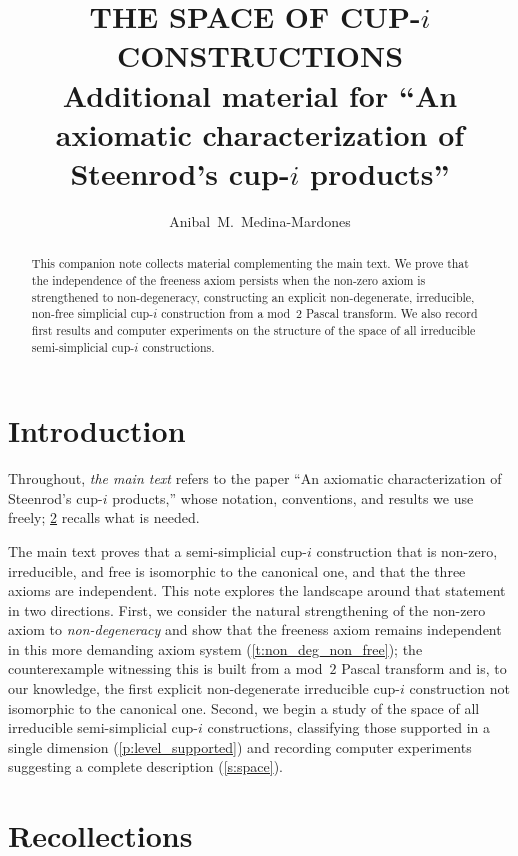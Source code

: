 \documentclass{amsart}
\title[Additional material]{THE SPACE OF CUP-$i$ CONSTRUCTIONS \\ \large Additional material for ``An axiomatic characterization of Steenrod's cup-$i$ products''}
\author{Anibal~M.~Medina-Mardones}
\begin{document}
\begin{abstract}
	This companion note collects material complementing the main text.
	We prove that the independence of the freeness axiom persists when the non-zero axiom is strengthened to non-degeneracy, constructing an explicit non-degenerate, irreducible, non-free simplicial \mbox{cup-$i$} construction from a mod~$2$ Pascal transform.
	We also record first results and computer experiments on the structure of the space of all irreducible semi-simplicial \mbox{cup-$i$} constructions.
\end{abstract}
\maketitle

\section{Introduction}\label{s:intro}

Throughout, \emph{the main text} refers to the paper ``An axiomatic characterization of Steenrod's \mbox{cup-$i$} products,'' whose notation, conventions, and results we use freely; \cref{s:recollections} recalls what is needed.

The main text proves that a semi-simplicial \mbox{cup-$i$} construction that is non-zero, irreducible, and free is isomorphic to the canonical one, and that the three axioms are independent.
This note explores the landscape around that statement in two directions.
First, we consider the natural strengthening of the non-zero axiom to \emph{non-degeneracy} and show that the freeness axiom remains independent in this more demanding axiom system (\cref{t:non_deg_non_free}); the counterexample witnessing this is built from a mod~$2$ Pascal transform and is, to our knowledge, the first explicit non-degenerate irreducible \mbox{cup-$i$} construction not isomorphic to the canonical one.
Second, we begin a study of the space of all irreducible semi-simplicial \mbox{cup-$i$} constructions, classifying those supported in a single dimension (\cref{p:level_supported}) and recording computer experiments suggesting a complete description (\cref{s:space}).

\section{Recollections}\label{s:recollections}
\end{document}
